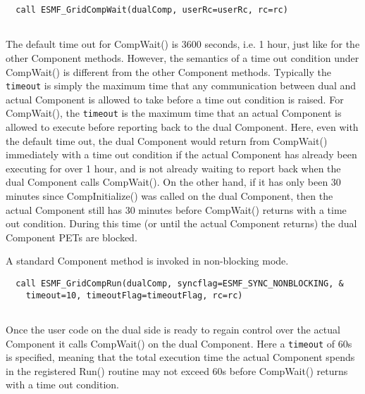  \begin{verbatim}
  call ESMF_GridCompWait(dualComp, userRc=userRc, rc=rc)
 
\end{verbatim}
 

  
   The default time out for CompWait() is 3600 seconds, i.e. 1 hour, just like
   for the other Component methods. However, the semantics of a time out 
   condition under CompWait() is different from the other Component methods. Typically the {\tt timeout} is simply the
   maximum time that any communication between dual and actual Component is allowed 
   to take before a time out condition is raised. For CompWait(), the {\tt timeout}
   is the maximum time that an actual Component is allowed to execute before
   reporting back to the dual Component. Here, even with the default time out, 
   the dual Component would return from CompWait() immediately with a time out
   condition if the actual Component has already been executing for over 1 hour, 
   and is not already waiting to report back when the dual Component calls 
   CompWait(). On the other hand, if it has only been 30 minutes since 
   CompInitialize() was called on the dual Component, then the actual Component
   still has 30 minutes before CompWait() returns with a time out condition.
   During this time (or until the actual Component returns) the dual Component
   PETs are blocked.
  
   A standard Component method is invoked in non-blocking mode. 

 \begin{verbatim}
  call ESMF_GridCompRun(dualComp, syncflag=ESMF_SYNC_NONBLOCKING, &
    timeout=10, timeoutFlag=timeoutFlag, rc=rc)
 
\end{verbatim}
 

  
   Once the user code on the dual side is ready to regain control over the
   actual Component it calls CompWait() on the dual Component. Here a
   {\tt timeout} of 60s is specified, meaning that the total execution time the
   actual Component spends in the registered Run() routine may not exceed 60s
   before CompWait() returns with a time out condition. 

